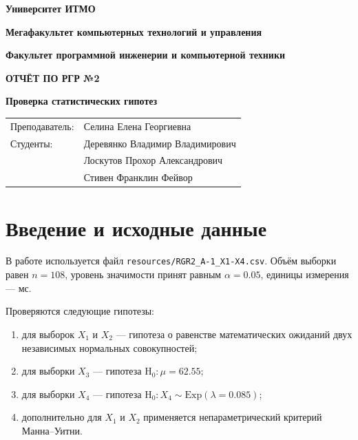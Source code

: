 \documentclass[12pt,a4paper]{article}
\newcommand{\num}[1]{#1}
\newcommand{\hypnull}{\mathrm{H}_0}
\begin{document}
\begin{titlepage}
\thispagestyle{empty}
\begin{center}
{\bfseries Университет ИТМО \par}
{\bfseries Мегафакультет компьютерных технологий и управления \par}
{\bfseries Факультет программной инженерии и компьютерной техники \par}

\vspace{5cm}

{\Large\bfseries ОТЧЁТ ПО РГР №2\par}
\vspace{0.5cm}
{\Large\bfseries Проверка статистических гипотез\par}

\vfill
\end{center}

\begin{flushright}
\begin{tabular}{ll}
Преподаватель: & Селина Елена Георгиевна \\
Студенты: & Деревянко Владимир Владимирович \\
 & Лоскутов Прохор Александрович \\
 & Стивен Франклин Фейвор \\
\end{tabular}
\end{flushright}
\end{titlepage}

\section{Введение и исходные данные}

В работе используется файл \texttt{resources/RGR2\_A-1\_X1-X4.csv}. Объём выборки равен $n=\num{108}$, уровень значимости принят равным $\alpha=\num{0.05}$, единицы измерения --- мс.

Проверяются следующие гипотезы:
\begin{enumerate}[label=\arabic*.]
\item для выборок $X_1$ и $X_2$ --- гипотеза о равенстве математических ожиданий двух независимых нормальных совокупностей;
\item для выборки $X_3$ --- гипотеза $\hypnull\colon \mu=\num{62.55}$;
\item для выборки $X_4$ --- гипотеза $\hypnull\colon X_4 \sim \mathrm{Exp}(\lambda=\num{0.085})$;
\item дополнительно для $X_1$ и $X_2$ применяется непараметрический критерий Манна--Уитни.
\end{enumerate}
\end{document}
